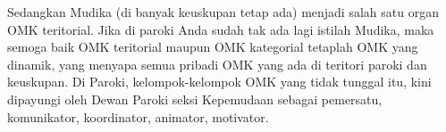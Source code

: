 Sedangkan Mudika (di banyak keuskupan tetap ada) menjadi salah satu organ OMK teritorial. Jika di paroki Anda sudah tak ada lagi istilah Mudika, maka semoga baik OMK teritorial maupun OMK kategorial tetaplah OMK yang dinamik, yang menyapa semua pribadi OMK yang ada di teritori paroki dan keuskupan. Di Paroki, kelompok-kelompok OMK yang tidak tunggal itu, kini dipayungi oleh Dewan Paroki seksi Kepemudaan sebagai pemersatu, komunikator, koordinator, animator, motivator.



 